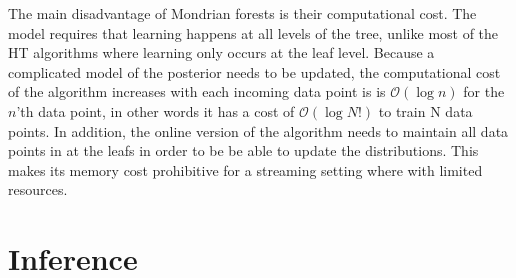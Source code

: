 The main disadvantage of Mondrian forests is their computational cost. The model
requires that learning happens at all levels of the tree, unlike most of the HT
algorithms where learning only occurs at the leaf level. Because a complicated
model of the posterior needs to be updated, the computational cost of the algorithm
increases with each incoming data point is is $\mathcal{O}(\log n)$ for the $n$'th
data point, in other words it has a cost of $\mathcal{O}(\log N!)$ to train N
data points. In addition, the online version of the algorithm needs to maintain
all data points in at the leafs in order to be be able to update the distributions.
This makes its memory cost prohibitive for a streaming setting where with limited resources.



\section{Inference}
\label{sec:bg-dt-inference}